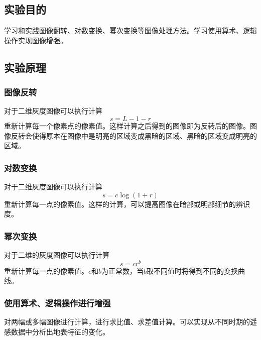 \subsection{实验目的}
学习和实践图像翻转、对数变换、幂次变换等图像处理方法。学习使用算术、逻辑操作实现图像增强。
\subsection{实验原理}
\subsubsection{图像反转}
对于二维灰度图像可以执行计算
\[ s=L-1-r \]
重新计算每一个像素点的像素值。这样计算之后得到的图像即为反转后的图像。图像反转会使得原本在图像中是明亮的区域变成黑暗的区域、黑暗的区域变成明亮的区域。
\subsubsection{对数变换}
对于二维灰度图像可以执行计算
\[ s=c\log(1+r) \]
重新计算每一点的像素值。这样的计算，可以提高图像在暗部或明部细节的辨识度。%
\subsubsection{幂次变换}
对于二维的灰度图像可以执行计算
\[ s=cr^b \]
重新计算每一点的像素值。$c$和$b$为正常数，当$b$取不同值时将得到不同的变换曲线。
\subsubsection{使用算术、逻辑操作进行增强}
对两幅或多幅图像进行计算，进行求比值、求差值计算。可以实现从不同时期的遥感数据中分析出地表特征的变化。

